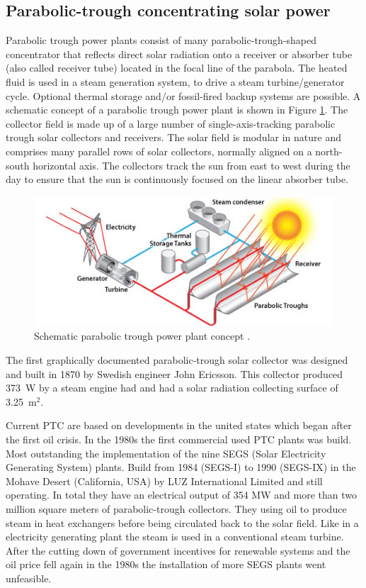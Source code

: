 \subsection{Parabolic-trough concentrating solar power} \label{subsection_PTC}
Parabolic trough power plants consist of many parabolic-trough-shaped concentrator that reflects direct solar radiation onto a receiver or absorber tube (also called receiver tube) located in the focal line of the parabola. The heated fluid is used in a steam generation system, to drive a steam turbine/generator cycle. Optional thermal storage and/or fossil-fired backup systems are possible. A schematic concept of a parabolic trough power plant is shown in Figure \ref{parabolic_troughs}. The collector field is made up of a large number of single-axis-tracking parabolic trough solar collectors and receivers. The solar field is modular in nature and comprises many parallel rows of solar collectors, normally aligned on a north-south horizontal axis. The collectors track the sun from east to west during the day to ensure that the sun is continuously focused on the linear absorber tube.
\begin{figure}[!h] 
\centering
\includegraphics[width=0.7\linewidth]{FIG/parabolic_troughs}
\caption[Schematic parabolic trough power plant concept.]{Schematic parabolic trough power plant concept \cite{U.S.DOE2013}.}\label{parabolic_troughs}
\end{figure}


The first graphically documented parabolic-trough solar collector was designed and built in 1870 by Swedish engineer John Ericsson. This collector produced 373~W by a steam engine had and had a solar radiation collecting surface of 3.25~m$^2$. \cite{Fernandez-Garcia2010}

Current PTC are based on developments in the united states which began after the first oil crisis. In the 1980s the first commercial used PTC plants was build. Most outstanding the implementation of the nine SEGS (Solar Electricity Generating System) plants. Build from 1984 (SEGS-I) to 1990 (SEGS-IX) in the Mohave Desert (California, USA) by LUZ International Limited and still operating. In total they have an electrical output of 354 MW and more than two million square meters of parabolic-trough collectors. They using oil to produce steam in heat exchangers before being circulated back to the solar field. Like in a electricity generating plant the steam is used in a conventional steam turbine. After the cutting down of government incentives for renewable systems and the oil price fell again in the 1980s the installation of more SEGS plants went unfeasible. \cite{Kalogirou2014a}


